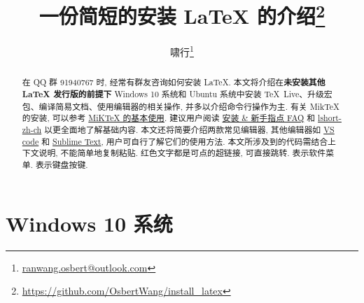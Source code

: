 \documentclass{ctexrep}
\title{\bfseries 一份简短的安装 \LaTeX{} 的介绍\thanks{\url{https://github.com/OsbertWang/install_latex}}}
\author{啸行\thanks{\url{ranwang.osbert@outlook.com}}}
\begin{document}
  
\maketitle

\begin{abstract}
在 QQ 群 91940767 时, 经常有群友咨询如何安装 \LaTeX.
本文将介绍在\textbf{未安装其他 \LaTeX{} 发行版的前提下} Windows 10 系统和 Ubuntu 系统中安装 \TeX{}~Live、升级宏包、编译简易文档、使用编辑器的相关操作, 并多以介绍命令行操作为主.
有关 Mik\TeX{} 的安装, 可以参考 \href{https://camuseblog.top/2019-03-02-/MiKTeX/}{MiK\TeX{} 的基本使用}.
建议用户阅读 \href{http://www.latexstudio.net/archives/11469.html}{\LaTeXe{} 安装 \& 新手指点 FAQ} 和 \href{http://mirrors.ctan.org/info/lshort/chinese/lshort-zh-cn.pdf}{lshort-zh-ch} 以更全面地了解基础内容.
本文还将简要介绍两款常见编辑器, 其他编辑器如 \href{https://github.com/EthanDeng/vscode-latex}{VS code} 和 \href{https://github.com/EthanDeng/sublime-text-latex}{Sublime Text}, 用户可自行了解它们的使用方法.
本文所涉及到的代码需结合上下文说明, 不能简单地复制粘贴.
红色文字都是可点的超链接, 可直接跳转.
 表示软件菜单.
 表示键盘按键.
\end{abstract}

\tableofcontents

\chapter{Windows 10 系统}
\end{document}
